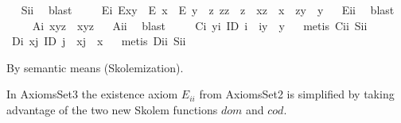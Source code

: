 \begin{isabellebody}
\isadelimproof
\ %
\endisadelimproof
%
\isatagproof
{}\isamarkupfalse%
\ S\isactrlsub i\isactrlsub i\ \isamarkupfalse%
\ blast%
\endisatagproof
{\isafoldproof}%
%
\isadelimproof
%
\endisadelimproof
\isanewline
\ \ \ \isamarkupfalse%
\ E\isactrlsub i{\isacharcolon}\ {\isachardoublequoteopen}E{\isacharparenleft}x{\isasymcdot}y{\isacharparenright}\ \isactrlbold {\isasymleftarrow}\ {\isacharparenleft}E\ x\ \isactrlbold {\isasymand}\ E\ y\ \isactrlbold {\isasymand}\ {\isacharparenleft}\isactrlbold {\isasymexists}z{\isachardot}\ z{\isasymcdot}z\ {\isasymcong}\ z\ \isactrlbold {\isasymand}\ x{\isasymcdot}z\ {\isasymcong}\ x\ \isactrlbold {\isasymand}\ z{\isasymcdot}y\ {\isasymcong}\ y{\isacharparenright}{\isacharparenright}{\isachardoublequoteclose}%
\isadelimproof
\ %
\endisadelimproof
%
\isatagproof
{}\isamarkupfalse%
\ E\isactrlsub i\isactrlsub i\ \isamarkupfalse%
\ blast%
\endisatagproof
{\isafoldproof}%
%
\isadelimproof
%
\endisadelimproof
\isanewline
\ \ \ \isamarkupfalse%
\ A\isactrlsub i{\isacharcolon}\ {\isachardoublequoteopen}x{\isasymcdot}{\isacharparenleft}y{\isasymcdot}z{\isacharparenright}\ {\isasymcong}\ {\isacharparenleft}x{\isasymcdot}y{\isacharparenright}{\isasymcdot}z{\isachardoublequoteclose}%
\isadelimproof
\ %
\endisadelimproof
%
\isatagproof
{}\isamarkupfalse%
\ A\isactrlsub i\isactrlsub i\ \isamarkupfalse%
\ blast%
\endisatagproof
{\isafoldproof}%
%
\isadelimproof
%
\endisadelimproof
\isanewline
\ \ \ \isamarkupfalse%
\ C\isactrlsub i{\isacharcolon}\ {\isachardoublequoteopen}\isactrlbold {\isasymforall}y{\isachardot}\isactrlbold {\isasymexists}i{\isachardot}\ ID\ i\ \isactrlbold {\isasymand}\ i{\isasymcdot}y\ {\isasymcong}\ y{\isachardoublequoteclose}%
\isadelimproof
\ %
\endisadelimproof
%
\isatagproof
{}\isamarkupfalse%
\ {\isacharparenleft}metis\ C\isactrlsub i\isactrlsub i\ S\isactrlsub i\isactrlsub i{\isacharparenright}%
\endisatagproof
{\isafoldproof}%
%
\isadelimproof
%
\endisadelimproof
\isanewline
\ \ \ \isamarkupfalse%
\ D\isactrlsub i{\isacharcolon}\ {\isachardoublequoteopen}\isactrlbold {\isasymforall}x{\isachardot}\isactrlbold {\isasymexists}j{\isachardot}\ ID\ j\ \isactrlbold {\isasymand}\ x{\isasymcdot}j\ {\isasymcong}\ x{\isachardoublequoteclose}%
\isadelimproof
\ %
\endisadelimproof
%
\isatagproof
{}\isamarkupfalse%
\ {\isacharparenleft}metis\ D\isactrlsub i\isactrlsub i\ S\isactrlsub i\isactrlsub i{\isacharparenright}%
\endisatagproof
{\isafoldproof}%
%
\isadelimproof
%
\endisadelimproof
\isanewline
\ \ \isamarkupfalse%
%
\isamarkuptrue%
%
\begin{isamarkuptext}%
By semantic means (Skolemization).%
\end{isamarkuptext}\isamarkuptrue%
%
\isamarkuptrue%
%
\begin{isamarkuptext}%
In AxiomsSet3 the existence  axiom  $E_{ii}$ from AxiomsSet2  is simplified by taking 
      advantage of the two new Skolem functions $dom$ and $cod$.


\end{isamarkuptext}
\end{isabellebody}
